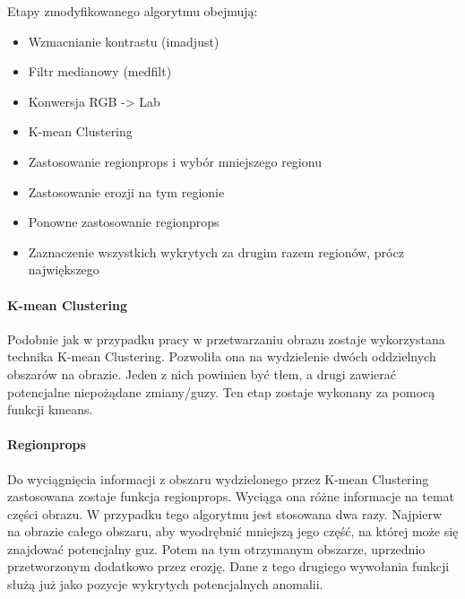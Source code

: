\documentclass[11pt,openany]{sprawozdanie-agh}
\begin{document}
Etapy zmodyfikowanego algorytmu obejmują:
\begin{itemize}
\item Wzmacnianie kontrastu (imadjust)
\item Filtr medianowy (medfilt)
\item Konwersja RGB -> Lab
\item K-mean Clustering
\item Zastosowanie regionprops i wybór mniejszego regionu 
\item Zastosowanie erozji na tym regionie 
\item Ponowne zastosowanie regionprops
\item Zaznaczenie wszystkich wykrytych za drugim razem regionów, prócz największego
\end{itemize}

\paragraph{K-mean Clustering\\}
Podobnie jak w przypadku pracy \cite{Mohapatra:2011:ALD:1947940.1947980} w przetwarzaniu obrazu zostaje wykorzystana technika K-mean Clustering. Pozwoliła ona na wydzielenie dwóch oddzielnych obszarów na obrazie. Jeden z nich powinien być tłem, a drugi zawierać potencjalne niepożądane zmiany/guzy. Ten etap zostaje wykonany za pomocą funkcji kmeans.

\paragraph{Regionprops\\}
Do wyciągnięcia informacji z obszaru wydzielonego przez K-mean Clustering zastosowana zostaje funkcja regionprops. Wyciąga ona różne informacje na temat części obrazu. W przypadku tego algorytmu jest stosowana dwa razy. Najpierw na obrazie całego obszaru, aby wyodrębnić mniejszą jego część, na której może się znajdować potencjalny guz. Potem na tym otrzymanym obszarze, uprzednio przetworzonym dodatkowo przez erozję. Dane z tego drugiego wywołania funkcji służą już jako pozycje wykrytych potencjalnych anomalii.
\end{document}
